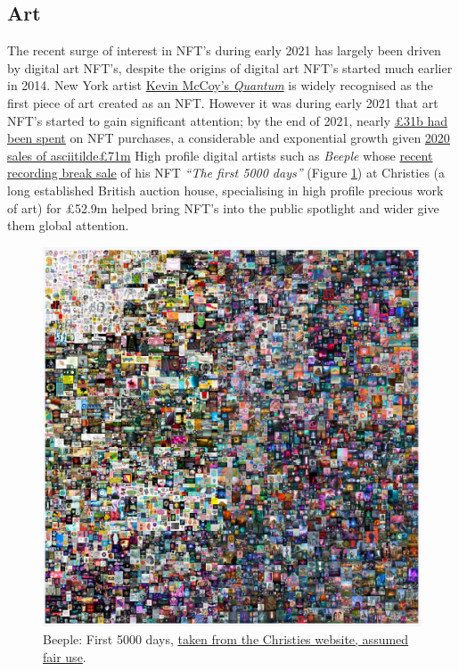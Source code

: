 
\subsection{Art}
The recent surge of interest in NFT's during early 2021 has largely been
driven by digital art NFT's, despite the origins of digital art NFT's
started much earlier in 2014. New York artist \href{https://www.mccoyspace.com/project/125/}{Kevin McCoy's
\emph{Quantum}} is widely recognised as the first piece of art created
as an NFT. However it was during early 2021 that art NFT's started to
gain significant attention; by the end of 2021, nearly \href{https://www.paymentscardsandmobile.com/state-of-the-blockchain-nfts-explode-onto-scene-in-2021/}{£31b
had been spent} on NFT purchases, a considerable and exponential growth
given \href{https://raritysniper.com/news/nfts-exploded-in-2021-with-25-billion-in-sales/}{2020
sales of asciitilde£71m}
High profile digital artists such as \emph{Beeple} whose
\href{https://www.forbes.com/sites/abrambrown/2021/03/11/beeple-art-sells-for-693-million-becoming-most-expensive-nft-ever/?sh=3f237d1c2448}{recent
recording break sale} of his NFT \emph{``The first 5000 days''} (Figure \ref{fig:first5000days}) at Christies (a long established British auction house,
specialising in high profile precious work of art) for £52.9m helped
bring NFT's into the public spotlight and wider give them global
attention.

\begin{figure}[ht]\centering %
	\includegraphics{first5000days}
	\caption{Beeple: First 5000 days, \href{https://onlineonly.christies.com/s/beeple-first-5000-days/lots/2020}{taken from the Christies website, assumed fair use}.}
	\label{fig:first5000days}
\end{figure}


